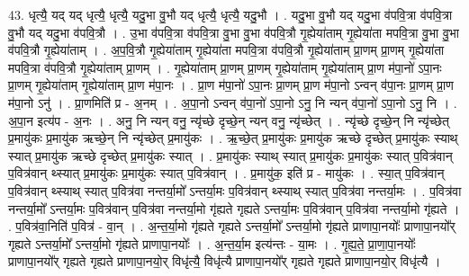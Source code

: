 \documentclass[17pt]{extarticle}
\begin{document}
43. धृत्यै॒ यद् यद् धृत्यै॒ धृत्यै॒ यदु॒भा वु॒भौ यद् धृत्यै॒ धृत्यै॒ यदु॒भौ । . यदु॒भा वु॒भौ यद् यदु॒भा व॑पवि॒त्रा व॑पवि॒त्रा वु॒भौ यद् यदु॒भा व॑पवि॒त्रौ । . उ॒भा व॑पवि॒त्रा व॑पवि॒त्रा वु॒भा वु॒भा व॑पवि॒त्रौ गृ॒ह्येया॑ताम् गृ॒ह्येया॑ता मपवि॒त्रा वु॒भा वु॒भा व॑पवि॒त्रौ गृ॒ह्येया॑ताम् । . अ॒प॒वि॒त्रौ गृ॒ह्येया॑ताम् गृ॒ह्येया॑ता मपवि॒त्रा व॑पवि॒त्रौ गृ॒ह्येया॑ताम् प्रा॒णम् प्रा॒णम् गृ॒ह्येया॑ता मपवि॒त्रा व॑पवि॒त्रौ गृ॒ह्येया॑ताम् प्रा॒णम् । . गृ॒ह्येया॑ताम् प्रा॒णम् प्रा॒णम् गृ॒ह्येया॑ताम् गृ॒ह्येया॑ताम् प्रा॒ण म॑पा॒नो॑ ऽपा॒नः प्रा॒णम् गृ॒ह्येया॑ताम् गृ॒ह्येया॑ताम् प्रा॒ण म॑पा॒नः । . प्रा॒ण म॑पा॒नो॑ ऽपा॒नः प्रा॒णम् प्रा॒ण म॑पा॒नो ऽन्वन् व॑पा॒नः प्रा॒णम् प्रा॒ण म॑पा॒नो ऽनु॑ । . प्रा॒णमिति॑ प्र - अ॒नम् । . अ॒पा॒नो ऽन्वन् व॑पा॒नो॑ ऽपा॒नो ऽनु॒ नि न्यन् व॑पा॒नो॑ ऽपा॒नो ऽनु॒ नि । . अ॒पा॒न इत्य॑प - अ॒नः । . अनु॒ नि न्यन् वनु॒ न्यृ॑च्छे दृच्छे॒न् न्यन् वनु॒ न्यृ॑च्छेत् । . न्यृ॑च्छे दृच्छे॒न् नि न्यृ॑च्छेत् प्र॒मायु॑कः प्र॒मायु॑क ऋच्छे॒न् नि न्यृ॑च्छेत् प्र॒मायु॑कः । . ऋ॒च्छे॒त् प्र॒मायु॑कः प्र॒मायु॑क ऋच्छे दृच्छेत् प्र॒मायु॑कः स्याथ् स्यात् प्र॒मायु॑क ऋच्छे दृच्छेत् प्र॒मायु॑कः स्यात् । . प्र॒मायु॑कः स्याथ् स्यात् प्र॒मायु॑कः प्र॒मायु॑कः स्यात् प॒वित्र॑वान् प॒वित्र॑वान् थ्स्यात् प्र॒मायु॑कः प्र॒मायु॑कः स्यात् प॒वित्र॑वान् । . प्र॒मायु॑क॒ इति॑ प्र - मायु॑कः । . स्या॒त् प॒वित्र॑वान् प॒वित्र॑वान् थ्स्याथ् स्यात् प॒वित्र॑वा नन्तर्या॒मो᳚ ऽन्तर्या॒मः प॒वित्र॑वान् थ्स्याथ् स्यात् प॒वित्र॑वा नन्तर्या॒मः । . प॒वित्र॑वा नन्तर्या॒मो᳚ ऽन्तर्या॒मः प॒वित्र॑वान् प॒वित्र॑वा नन्तर्या॒मो गृ॑ह्यते गृह्यते ऽन्तर्या॒मः प॒वित्र॑वान् प॒वित्र॑वा नन्तर्या॒मो गृ॑ह्यते । . प॒वित्र॑वा॒निति॑ प॒वित्र॑ - वा॒न् । . अ॒न्त॒र्या॒मो गृ॑ह्यते गृह्यते ऽन्तर्या॒मो᳚ ऽन्तर्या॒मो गृ॑ह्यते प्राणापा॒नयोः᳚ प्राणापा॒नयो᳚र् गृह्यते ऽन्तर्या॒मो᳚ ऽन्तर्या॒मो गृ॑ह्यते प्राणापा॒नयोः᳚ । . अ॒न्त॒र्या॒म इत्य॑न्तः - या॒मः । . गृ॒ह्य॒ते॒ प्रा॒णा॒पा॒नयोः᳚ प्राणापा॒नयो᳚र् गृह्यते गृह्यते प्राणापा॒नयो॒र् विधृ॑त्यै॒ विधृ॑त्यै प्राणापा॒नयो᳚र् गृह्यते गृह्यते प्राणापा॒नयो॒र् विधृ॑त्यै । \newline
\pagebreak
{}
\end{document}
